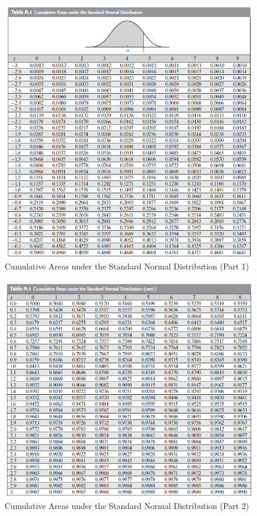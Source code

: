 \documentclass[12pt]{article}
\begin{document}
\begin{figure}[ht]
    \centering
    \includegraphics[width=\textwidth]{images/z-table_1.png}
    \caption{Cumulative Areas under the Standard Normal Distribution (Part 1)}
\end{figure}

\begin{figure}[ht]
    \centering
    \includegraphics[width=\textwidth]{images/z-table_2.png}
    \caption{Cumulative Areas under the Standard Normal Distribution (Part 2)}
\end{figure}
\end{document}

